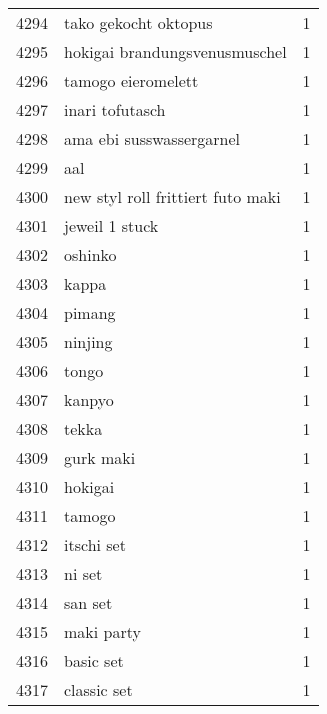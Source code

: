\begin{tabular}{llr}
4294 &                               tako gekocht oktopus &      1 \\
4295 &                      hokigai brandungsvenusmuschel &      1 \\
4296 &                                 tamogo eieromelett &      1 \\
4297 &                                    inari tofutasch &      1 \\
4298 &                           ama ebi susswassergarnel &      1 \\
4299 &                                                aal &      1 \\
4300 &                  new styl roll frittiert futo maki &      1 \\
4301 &                                     jeweil 1 stuck &      1 \\
4302 &                                            oshinko &      1 \\
4303 &                                              kappa &      1 \\
4304 &                                             pimang &      1 \\
4305 &                                            ninjing &      1 \\
4306 &                                              tongo &      1 \\
4307 &                                             kanpyo &      1 \\
4308 &                                              tekka &      1 \\
4309 &                                          gurk maki &      1 \\
4310 &                                            hokigai &      1 \\
4311 &                                             tamogo &      1 \\
4312 &                                         itschi set &      1 \\
4313 &                                             ni set &      1 \\
4314 &                                            san set &      1 \\
4315 &                                         maki party &      1 \\
4316 &                                          basic set &      1 \\
4317 &                                        classic set &      1 \\

\end{tabular}
